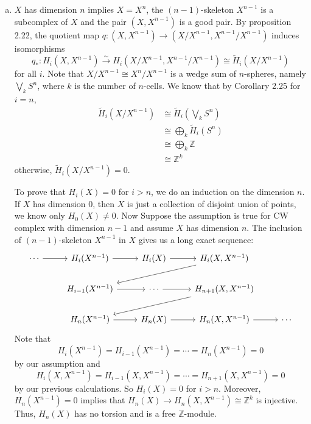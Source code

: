\documentclass[a4paper, 12pt]{article}
\begin{document}
\begin{solution}
\begin{enumerate}[(a)]
	\item \(X\) has dimension \(n\) implies \(X=X^n\), the \((n-1)\)-skeleton \(X^{n-1}\) is a subcomplex of \(X\) and the pair \((X,X^{n-1})\) is a good pair. By proposition 2.22, the quotient map 
	      \(q:(X,X^{n-1})\rightarrow (X/X^{n-1},X^{n-1}/X^{n-1})\) induces isomorphisms 
		  \[q_*:H_i(X,X^{n-1})\xrightarrow{\sim} H_i(X/X^{n-1},X^{n-1}/X^{n-1})\cong \tilde{H}_i(X/X^{n-1})\] 
		  for all \(i\). Note that \(X/X^{n-1}\cong X^n/X^{n-1}\) is a wedge sum of \(n\)-spheres, namely \(\bigvee_k S^n\), where \(k\) is the number of \(n\)-cells. We know that  by Corollary 2.25 for \(i=n\), 
		  \begin{align*}
			\tilde{H}_i(X/X^{n-1}) & \cong \tilde{H}_i(\bigvee_k S^n)\\ 
			                       & \cong \bigoplus_k \tilde{H}_i(S^n)\\ 
								   & \cong \bigoplus_k \mathbb{Z}\\ 
								   & \cong \mathbb{Z}^k
		  \end{align*}
		  otherwise, \(\tilde{H}_i(X/X^{n-1})=0\). 
		  \par 
		  To prove that \(H_i(X)=0\) for \(i>n\), we do an induction on the dimension \(n\). If \(X\) has dimension \(0\), then \(X\) is just a collection of disjoint union of points, we know only \(H_0(X)\neq 0\). Now Suppose 
		  the assumption is true for CW complex with dimension \(n-1\) and assume \(X\) has dimension \(n\). The inclusion of \((n-1)\)-skeleton \(X^{n-1}\) in \(X\) gives us a long exact sequence:
\[\begin{tikzcd}
	\cdots & {H_i(X^{n-1})} & {H_i(X)} & {H_i(X,X^{n-1})} \\
	& {H_{i-1}(X^{n-1})} & \cdots & {H_{n+1}(X,X^{n-1})} \\
	& {H_n(X^{n-1})} & {H_n(X)} & {H_n(X,X^{n-1})} & \cdots
	\arrow[from=1-1, to=1-2]
	\arrow[from=1-2, to=1-3]
	\arrow[from=1-3, to=1-4]
	\arrow[from=1-4, to=2-2]
	\arrow[from=2-2, to=2-3]
	\arrow[from=2-3, to=2-4]
	\arrow[from=2-4, to=3-2]
	\arrow[from=3-2, to=3-3]
	\arrow[from=3-3, to=3-4]
	\arrow[from=3-4, to=3-5]
\end{tikzcd}\]
Note that 
\[H_i(X^{n-1})=H_{i-1}(X^{n-1})=\cdots=H_n(X^{n-1})=0\]
by our assumption and 
\[H_i(X,X^{n-1})=H_{i-1}(X,X^{n-1})=\cdots=H_{n+1}(X,X^{n-1})=0\]
by our previous calculations. So \(H_i(X)=0\) for \(i>n\). Moreover, \(H_n(X^{n-1})=0\) implies that \(H_n(X)\rightarrow H_n(X,X^{n-1})\cong \mathbb{Z}^k\) is injective. Thus, \(H_n(X)\) has no torsion and is a free \(\mathbb{Z}\)-module.

\end{enumerate}
\end{solution}
\end{document}
